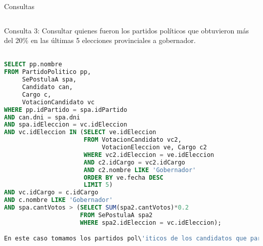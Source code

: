 \begin{section}{Consultas}
\begin{lstlisting}[language=SQL, basicstyle=\footnotesize]
\end{lstlisting} 

\noindent Consulta 3: Consultar quienes fueron los partidos pol\'iticos que obtuvieron m\'as del 20$\%$ en las \'ultimas 5 elecciones provinciales a gobernador.



\begin{lstlisting}[language=SQL, basicstyle=\footnotesize]

SELECT pp.nombre
FROM PartidoPolitico pp, 
     SePostulaA spa, 
     Candidato can, 
     Cargo c, 
     VotacionCandidato vc
WHERE pp.idPartido = spa.idPartido
AND can.dni = spa.dni
AND spa.idEleccion = vc.idEleccion
AND vc.idEleccion IN (SELECT ve.idEleccion
                      FROM VotacionCandidato vc2, 
                           VotacionEleccion ve, Cargo c2
                      WHERE vc2.idEleccion = ve.idEleccion
                      AND c2.idCargo = vc2.idCargo
                      AND c2.nombre LIKE 'Gobernador'
                      ORDER BY ve.fecha DESC
                      LIMIT 5)
AND vc.idCargo = c.idCargo
AND c.nombre LIKE 'Gobernador'
AND spa.cantVotos > (SELECT SUM(spa2.cantVotos)*0.2
                     FROM SePostulaA spa2
                     WHERE spa2.idEleccion = vc.idEleccion);

En este caso tomamos los partidos pol\'iticos de los candidatos que participan en las \'ultimas cinco elecci\'ones de manera similar a como tomamos los votantes m\'as tard\'ios de la consulta anterior, filtrando las elecciones por cargo a Gobernador. Luego pedimos que dichos candidatos junten una cantidad de votos mayor al 20% de la suma total de votos en la elecci\'on de la cual participan.

\end{lstlisting} 


\end{section}
